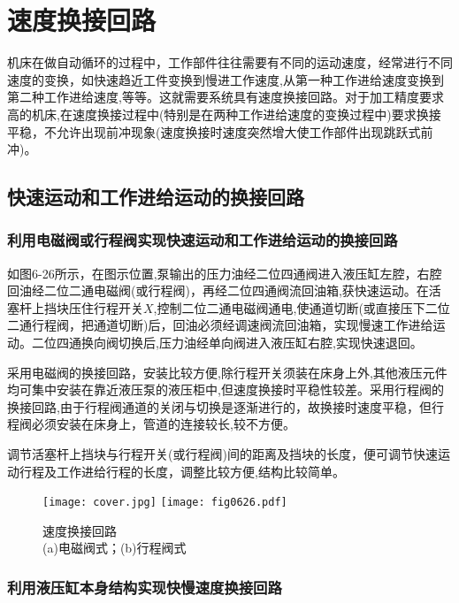 \section{速度换接回路}

机床在做自动循环的过程中，工作部件往往需要有不同的运动速度，经常进行不同速度的变换，如快速趋近工件变换到慢进工作速度,从第一种工作进给速度变换到第二种工作进给速度,等等。这就需要系统具有速度换接回路。对于加工精度要求高的机床,在速度换接过程中(特别是在两种工作进给速度的变换过程中)要求换接平稳，不允许出现前冲现象(速度换接时速度突然增大使工作部件出现跳跃式前冲)。

\subsection{快速运动和工作进给运动的换接回路}

\subsubsection{利用电磁阀或行程阀实现快速运动和工作进给运动的换接回路}

如图6-26所示，在图示位置,泵输出的压力油经二位四通阀进入液压缸左腔，右腔回油经二位二通电磁阀(或行程阀)，再经二位四通阀流回油箱,获快速运动。在活塞杆上挡块压住行程开关$X$,控制二位二通电磁阀通电,使通道切断(或直接压下二位二通行程阀，把通道切断)后，回油必须经调速阀流回油箱，实现慢速工作进给运动。二位四通换向阀切换后,压力油经单向阀进入液压缸右腔,实现快速退回。

采用电磁阀的换接回路，安装比较方便,除行程开关须装在床身上外,其他液压元件均可集中安装在靠近液压泵的液压柜中,但速度换接时平稳性较差。采用行程阀的换接回路,由于行程阀通道的关闭与切换是逐渐进行的，故换接时速度平稳，但行程阀必须安装在床身上，管道的连接较长,较不方便。

调节活塞杆上挡块与行程开关(或行程阀)间的距离及挡块的长度，便可调节快速运动行程及工作进给行程的长度，调整比较方便,结构比较简单。

\begin{figure}
\centering
\ifOpenSource
\texttt{[image: cover.jpg]}
\else
\texttt{[image: fig0626.pdf]}
\fi
\caption{速度换接回路\\(a)电磁阀式；(b)行程阀式}
\label{fig:fig0626}
\end{figure}

\subsubsection{利用液压缸本身结构实现快慢速度换接回路}

